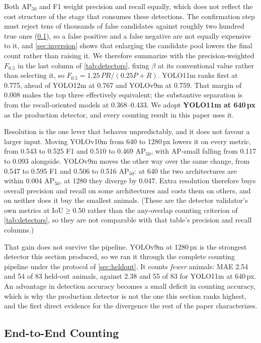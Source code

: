 Both AP$_{50}$ and F1 weight precision and recall equally, which does not reflect the cost
structure of the stage that consumes these detections. The confirmation step must reject
tens of thousands of false candidates against roughly two hundred true ones
(\cref{sec:counting}), so a false positive and a false negative are not equally expensive to
it, and \cref{sec:inversion} shows that enlarging the candidate pool lowers the final count rather than raising it. We therefore summarize with the precision-weighted
$F_{0.5}$ in the last column of \cref{tab:detectors}, fixing $\beta$ at its conventional
value rather than selecting it, so $F_{0.5}=1.25\,PR/(0.25P+R)$. YOLO11m ranks first at
0.775, ahead of YOLO12m at 0.767 and YOLOv9m at 0.759. That margin of 0.008 makes the top three effectively equivalent; the
substantive separation is from the recall-oriented models at 0.368--0.433. We adopt
\textbf{YOLO11m at 640\,px} as the production detector, and every counting result in this
paper uses it.

Resolution is the one lever that behaves unpredictably, and it does not favour a larger
input. Moving YOLOv10m from 640 to 1280\,px lowers it on every metric, from 0.543 to 0.525 F1
and 0.510 to 0.469 AP$_{50}$, with AP-small falling from 0.117 to 0.093 alongside. YOLOv9m
moves the other way over the same change, from 0.547 to 0.595 F1 and 0.506 to 0.516
AP$_{50}$: at 640 the two architectures are within 0.004 AP$_{50}$, at 1280 they diverge by
0.047. Extra resolution therefore buys overall precision and recall on some architectures and
costs them on others, and on neither does it buy the smallest animals. (These are the
detector validator's own metrics at IoU$\geq$0.50 rather than the any-overlap counting
criterion of \cref{tab:detectors}, so they are not comparable with that table's precision and
recall columns.)

That gain does not survive the pipeline. YOLOv9m at 1280\,px is the strongest detector this
section produced, so we ran it through the complete counting pipeline under the protocol of
\cref{sec:heldout}. It counts \emph{fewer} animals: MAE 2.54 and 54 of 83 held-out animals,
against 2.38 and 55 of 83 for YOLO11m at 640\,px. An advantage in detection accuracy becomes a
small deficit in counting accuracy, which is why the production detector is not the one this
section ranks highest, and the first direct evidence for the divergence the rest of the paper
characterizes.

\subsection{End-to-End Counting}
\label{sec:counting}

